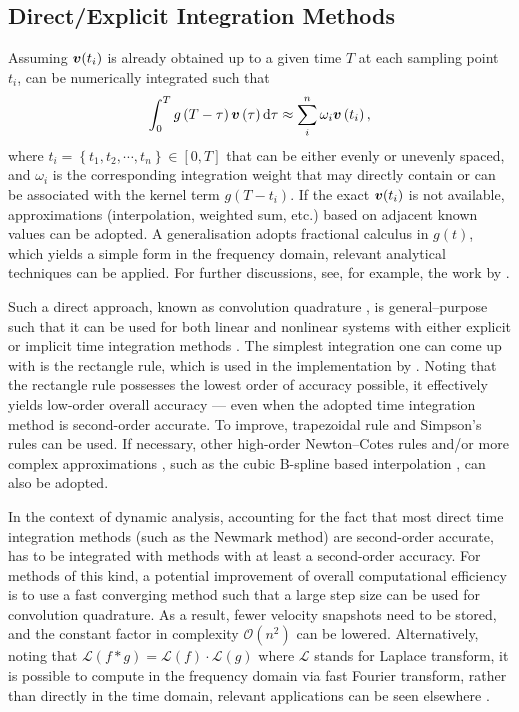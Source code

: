 \subsection{Direct/Explicit Integration Methods}
Assuming $\bm{v}(t_i)$ is already obtained up to a given time $T$ at each sampling point $t_i$,  can be numerically integrated such that
\begin{gather}
\int_0^Tg\left(T-\tau\right)\bm{v}\left(\tau\right)\mathrm{d}\tau\approx\sum_i^n\omega_i\bm{v}\left(t_i\right),
\end{gather}
where $t_i=\left\{t_1,t_2,\cdots,t_n\right\}\in[0,T]$ that can be either evenly or unevenly spaced, and $\omega_i$ is the corresponding integration weight that may directly contain or can be associated \citep{Schaedle2006} with the kernel term $g\left(T-t_i\right)$. If the exact $\bm{v}(t_i)$ is not available, approximations (interpolation, weighted sum, etc.) based on adjacent known values can be adopted. A generalisation adopts fractional calculus \citep[e.g.,][]{Bagley1983,Gaul1999} in $g(t)$, which yields a simple form in the frequency domain, relevant analytical techniques can be applied. For further discussions, see, for example, the work by \citet{Fernandez2019}.

Such a direct approach, known as convolution quadrature \citep[see][and the references therein]{Lubich2004}, is general--purpose such that it can be used for both linear and nonlinear systems with either explicit or implicit time integration methods \citep[see, e.g.,][]{Katsikadelis2019}. The simplest integration one can come up with is the rectangle rule, which is used in the implementation by \citet{Puthanpurayil2014}. Noting that the rectangle rule possesses the lowest order of accuracy possible, it effectively yields low-order overall accuracy --- even when the adopted time integration method is second-order accurate. To improve, trapezoidal rule \citep[e.g.,][]{Liu2014} and Simpson's rules \citep[e.g.,][]{Shen2019} can be used. If necessary, other high-order Newton--Cotes rules and/or more complex approximations \citep{Schaedle2006,Shen2021}, such as the cubic B-spline based interpolation \citep{Liu2023a,Liu2023b}, can also be adopted.

In the context of dynamic analysis, accounting for the fact that most direct time integration methods (such as the Newmark method) are second-order accurate,  has to be integrated with methods with at least a second-order accuracy. For methods of this kind, a potential improvement of overall computational efficiency is to use a fast converging method \citep{Schaedle2006} such that a large step size can be used for convolution quadrature. As a result, fewer velocity snapshots need to be stored, and the constant factor in complexity $\mathcal{O}\left(n^2\right)$ can be lowered.
Alternatively, noting that $\mathcal{L}\left(f*g\right)=\mathcal{L}\left(f\right)\cdot\mathcal{L}\left(g\right)$ where $\mathcal{L}$ stands for Laplace transform, it is possible to compute  in the frequency domain via fast Fourier transform, rather than directly in the time domain, relevant applications can be seen elsewhere \citep{Pan2013,Zhao2019}.

